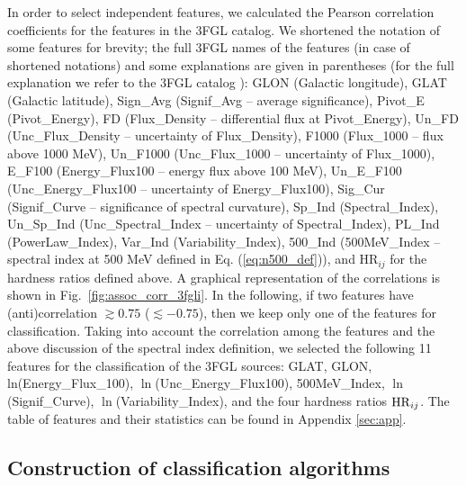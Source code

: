 \documentclass[referee]{aa} %
\begin{document}
In order to select independent features, we calculated the Pearson correlation coefficients for the features in the 3FGL catalog.
We shortened the notation of some features for brevity; the full 3FGL names of the features (in case of shortened notations) and some explanations are given in parentheses
(for the full explanation we refer to the 3FGL catalog \citep{2015ApJS..218...23A}):
GLON (Galactic longitude), 
GLAT (Galactic latitude),
Sign\_Avg (Signif\_Avg -- average significance), %
Pivot\_E (Pivot\_Energy), 
FD (Flux\_Density -- differential flux at Pivot\_Energy), 
Un\_FD (Unc\_Flux\_Density -- uncertainty of Flux\_Density), 
F1000 (Flux\_1000 -- flux above 1000 MeV), 
Un\_F1000 (Unc\_Flux\_1000 -- uncertainty of Flux\_1000),
E\_F100 (Energy\_Flux100 -- energy flux above 100 MeV),  
Un\_E\_F100 (Unc\_Energy\_Flux100 -- uncertainty of Energy\_Flux100), 
Sig\_Cur (Signif\_Curve -- significance of spectral curvature), 
Sp\_Ind (Spectral\_Index), 
Un\_Sp\_Ind (Unc\_Spectral\_Index -- uncertainty of Spectral\_Index),
PL\_Ind (PowerLaw\_Index), 
Var\_Ind (Variability\_Index), 
500\_Ind (500MeV\_Index -- spectral index at 500 MeV defined in Eq. (\ref{eq:n500_def})), 
and HR$_{ij}$ for the hardness ratios defined above.
A graphical representation of the correlations is shown in Fig.~\ref{fig:assoc_corr_3fgli}. 
In the following, if two features have (anti)correlation $\gtrsim 0.75$ 
($\lesssim -0.75$), then we keep only one of the features for classification.
Taking into account the correlation among the features and the above discussion of the spectral index definition,
we selected the following 11 features for the classification of the 3FGL sources:
GLAT, GLON, ln(Energy\_Flux\_100), $\ln$(Unc\_Energy\_Flux100), 500MeV\_Index, $\ln$(Signif\_Curve), 
$\ln$(Variability\_Index), and the four hardness ratios ${\rm HR}_{ij}$.  
The table of features and their statistics can be found in Appendix \ref{sec:app}.



\subsection{Construction of classification algorithms}
\end{document}

